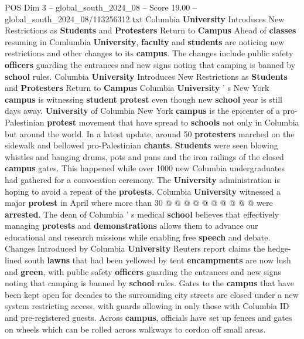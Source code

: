 \begin{textsample}{POS Dim 3 – global\_south\_2024\_08 – Score 19.00 – global\_south\_2024\_08/113256312.txt}  \label{ex:f3_pos_330}
Columbia \textbf{University} Introduces New Restrictions as \textbf{Students} and \textbf{Protesters} Return to \textbf{Campus} Ahead of \textbf{classes} resuming in Comlumbia \textbf{University}, \textbf{faculty} and \textbf{students} are noticing new restrictions and other changes to its \textbf{campus}.
The changes include public safety \textbf{officers} guarding the entrances and new signs noting that camping is banned by \textbf{school} rules.
Columbia \textbf{University} Introduces New Restrictions as \textbf{Students} and \textbf{Protesters} Return to \textbf{Campus} Columbia \textbf{University} ' s New York \textbf{campus} is witnessing \textbf{student} \textbf{protest} even though new \textbf{school} year is still days away. \textbf{University} of Columbia New York \textbf{campus} is the epicenter of a pro-Palestinian \textbf{protest} movement that have spread to \textbf{schools} not only in Columbia but around the world.
In a latest update, around 50 \textbf{protesters} marched on the sidewalk and bellowed pro-Palestinian \textbf{chants}. \textbf{Students} were seen blowing whistles and banging drums, pots and pans and the iron railings of the closed \textbf{campus} gates.
This happened while over 1000 new Columbia undergraduates had gathered for a convocation ceremony.
The \textbf{University} administration is hoping to avoid a repeat of the \textbf{protests}.
Columbia \textbf{University} witnessed a major \textbf{protest} in April where more than 30 @ @ @ @ @ @ @ @ @ @ were \textbf{arrested}.
The dean of Columbia ' s medical \textbf{school} believes that effectively managing \textbf{protests} and \textbf{demonstrations} allows them to advance our educational and research missions while enabling free \textbf{speech} and debate.
Changes Introduced by Columbia \textbf{University} Reuters report claims the hedge-lined south \textbf{lawns} that had been yellowed by tent \textbf{encampments} are now lush and \textbf{green}, with public safety \textbf{officers} guarding the entrances and new signs noting that camping is banned by \textbf{school} rules.
Gates to the \textbf{campus} that have been kept open for decades to the surrounding city streets are closed under a new system restricting access, with guards allowing in only those with Columbia ID and pre-registered guests.
Across \textbf{campus}, officials have set up fences and gates on wheels which can be rolled across walkways to cordon off small areas.

\end{textsample}
